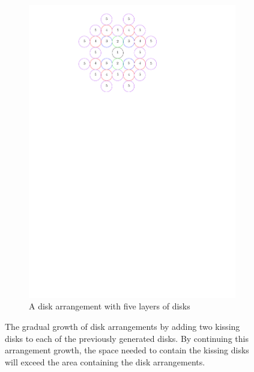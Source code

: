 \begin{figure}[H]
\begin{center}
\begin{subfigure}[b]{0.24\textwidth}
	  \includegraphics[width=\textwidth]{graphics/degree5arrangement.pdf}
	  \caption{A disk arrangement with five layers of disks}
	  \label{fig:circlePacking1-3}
  \end{subfigure}
\end{center} 
\caption{The gradual growth of disk arrangements by adding two kissing disks to each of the 
previously generated disks.  By continuing this arrangement growth, the space needed to contain the 
kissing disks will exceed the area containing the disk arrangements.}\label{fig:circlePacking-1}
\end{figure}

